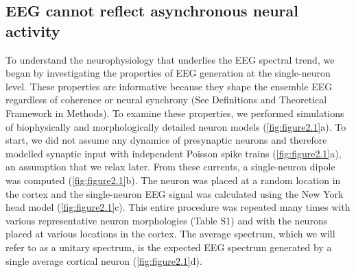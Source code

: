 \subsection{EEG cannot reflect asynchronous neural activity}
To understand the neurophysiology that underlies the EEG spectral trend, we began by investigating the properties of EEG generation at the single-neuron level. These properties are informative because they shape the ensemble EEG regardless of coherence or neural synchrony (See Definitions and Theoretical Framework in Methods). To examine these properties, we performed simulations of biophysically and morphologically detailed neuron models (\autoref{fig:figure2.1}a). To start, we did not assume any dynamics of presynaptic neurons and therefore modelled synaptic input with independent Poisson spike trains (\autoref{fig:figure2.1}a), an assumption that we relax later. From these currents, a single-neuron dipole was computed\cite{Næss2021} (\autoref{fig:figure2.1}b). The neuron was placed at a random location in the cortex and the single-neuron EEG signal was calculated using the New York head model\cite{Huang2016} (\autoref{fig:figure2.1}c). This entire procedure was repeated many times with various representative neuron morphologies (Table S1) and with the neurons placed at various locations in the cortex. The average spectrum, which we will refer to as a unitary spectrum, is the expected EEG spectrum generated by a single average cortical neuron (\autoref{fig:figure2.1}d). 



